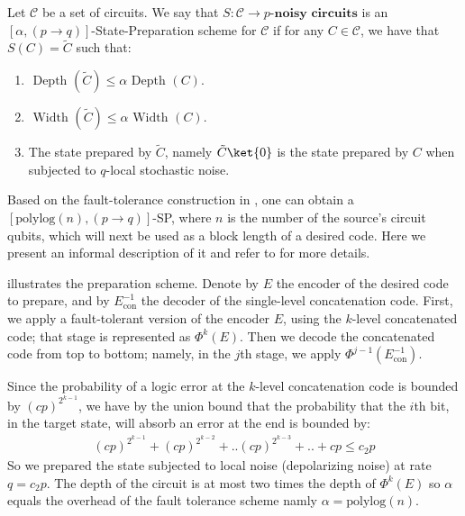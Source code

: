 \begin{definition} Let $\mathcal{C}$ be a set of circuits. We say that $S : \mathcal{C} \rightarrow p\textbf{-noisy circuits} $ is an $\left[ \alpha , (p \rightarrow q) \right]$-State-Preparation scheme for $\mathcal{C}$ if for any $C \in \mathcal{C}$, we have that $S(C) = \tilde{C}$ such that:
  \begin{enumerate}
    \item $\text{ Depth } (\tilde{C} ) \le \alpha \text{ Depth } (C )$. 
    \item $\text{ Width } (\tilde{C} ) \le \alpha \text{ Width } (C )$. 
    \item The state prepared by $\tilde{C}$, namely $\tilde{C}\ket{0}$ is the state prepared by $C$ when subjected to $q$-local stochastic noise. 
  \end{enumerate}  
  \end{definition}
Based on the fault-tolerance construction in \cite{aharonov1999faulttolerant}, one can obtain a $\left[ \text{polylog}(n) , (p \rightarrow q) \right]$-SP, where $n$ is the number of the source's circuit qubits, which will next be used as a block length of a desired code. Here we present an informal description of it and refer to \cite{grospellier:tel-03364419} for more details.

   illustrates the preparation scheme. Denote by $E$ the encoder of the desired code to prepare, and by $E_{\text{con}}^{-1}$ the decoder of the single-level concatenation code. First, we apply a fault-tolerant version of the encoder $E$, using the $k$-level concatenated code; that stage is represented as $\Phi^{k}(E)$. Then we decode the concatenated code from top to bottom; namely, in the $j$th stage, we apply $\Phi^{j-1}(E_{\text{con}}^{-1})$.
  
  Since the probability of a logic error at the $k$-level concatenation code is bounded by $(cp)^{2^{k-1}}$, we have by the union bound that the probability that the $i$th bit, in the target state, will absorb an error at the end is bounded by:
  \begin{equation*}
    \begin{split}
      \left( cp \right)^{2^{k-1}} + \left( cp \right)^{2^{k-2}} + .. \left( cp \right)^{2^{k-3}} + .. +  cp \le c_{2}p 
    \end{split}
  \end{equation*} So we prepared the state subjected to local noise (depolarizing noise) at rate $q=c_{2}p$. The depth of the circuit is at most two times the depth of $\Phi^{k}(E)$ so $\alpha$ equals the overhead of the fault tolerance scheme namly $\alpha = \text{polylog}(n)$.


